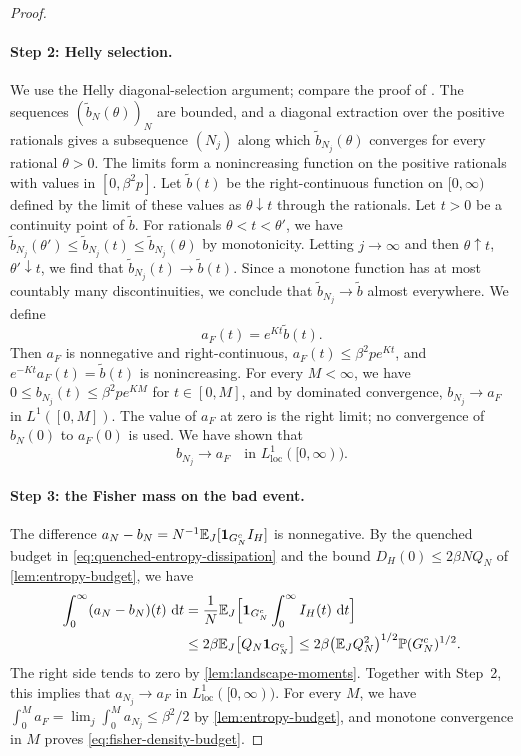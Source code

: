 \begin{proof}
\paragraph{Step 2: Helly selection.}
We use the Helly diagonal-selection argument; compare the proof of \cite[Theorem~25.9, p.~336]{billingsley1995}.
The sequences $(\tilde b_N(\theta))_N$ are bounded, and a diagonal extraction over the positive rationals gives a subsequence $(N_j)$ along which $\tilde b_{N_j}(\theta)$ converges for every rational $\theta>0$. The limits form a nonincreasing function on the positive rationals with values in $[0,\beta^2p]$. Let $\tilde b(t)$ be the right-continuous function on $[0,\infty)$ defined by the limit of these values as $\theta\downarrow t$ through the rationals. Let $t>0$ be a continuity point of $\tilde b$. For rationals $\theta<t<\theta'$, we have $\tilde b_{N_j}(\theta')\le\tilde b_{N_j}(t)\le\tilde b_{N_j}(\theta)$ by monotonicity. Letting $j\to\infty$ and then $\theta\uparrow t$, $\theta'\downarrow t$, we find that $\tilde b_{N_j}(t)\to\tilde b(t)$. Since a monotone function has at most countably many discontinuities, we conclude that $\tilde b_{N_j}\to\tilde b$ almost everywhere. We define
\[
 a_F(t)=e^{Kt}\tilde b(t).
\]
Then $a_F$ is nonnegative and right-continuous, $a_F(t)\le\beta^2pe^{Kt}$, and $e^{-Kt}a_F(t)=\tilde b(t)$ is nonincreasing. For every $M<\infty$, we have $0\le b_{N_j}(t)\le\beta^2pe^{KM}$ for $t\in[0,M]$, and by dominated convergence, $b_{N_j}\to a_F$ in $L^1([0,M])$. The value of $a_F$ at zero is the right limit; no convergence of $b_N(0)$ to $a_F(0)$ is used. We have shown that
\[
 b_{N_j}\longrightarrow a_F\quad\text{in }L^1_{\mathrm{loc}}([0,\infty)).
\]

\paragraph{Step 3: the Fisher mass on the bad event.}
The difference $a_N-b_N=N^{-1}\mathbb E_J[\mathbf 1_{G_N^c}I_H]$ is nonnegative. By the quenched budget in \eqref{eq:quenched-entropy-dissipation} and the bound $D_H(0)\le2\beta NQ_N$ of \cref{lem:entropy-budget}, we have
\[
\begin{aligned}
 \int_0^\infty(a_N-b_N)(t)\,\mathop{}\!\mathrm d t
 &=\frac1N\mathbb E_J\Bigl[\mathbf 1_{G_N^c}\int_0^\infty I_H(t)\,\mathop{}\!\mathrm d t\Bigr]\\
 &\le2\beta\mathbb E_J\bigl[Q_N\mathbf 1_{G_N^c}\bigr]
 \le2\beta\bigl(\mathbb E_JQ_N^2\bigr)^{1/2}\mathbb P(G_N^c)^{1/2}.
\end{aligned}
\]
The right side tends to zero by \cref{lem:landscape-moments}. Together with Step~2, this implies that $a_{N_j}\to a_F$ in $L^1_{\mathrm{loc}}([0,\infty))$. For every $M$, we have $\int_0^Ma_F=\lim_j\int_0^Ma_{N_j}\le\beta^2/2$ by \cref{lem:entropy-budget}, and monotone convergence in $M$ proves \eqref{eq:fisher-density-budget}.


\end{proof}
